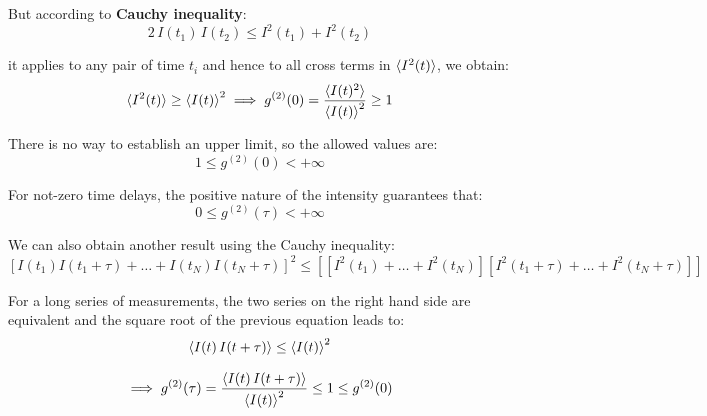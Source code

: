 But according to \textbf{Cauchy inequality}: 
\begin{equation}\label{eqn:cauchy-inequality}
2\, I(t_1)\, I(t_2) \leq I^2(t_1)+I^2(t_2)
\end{equation}

it applies to any pair of time $t_i$ and hence to all cross terms in $\braket{I^2(t)}$, we obtain:
\[\braket{I^2(t)} \geq \braket{I(t)}^2 \implies g^{(2)}(0) = \frac{\braket{I(t)^2}}{\braket{I(t)}^2}\geq 1 \]

There is no way to establish an upper limit, so the allowed values are:
\[1 \leq g^{(2)}(0) < +\infty\]

For not-zero time delays, the positive nature of the intensity guarantees that:
\[0 \leq g^{(2)}(\tau) < +\infty\]

We can also obtain another result using the Cauchy inequality:
\begin{equation}\label{eqn:cauchy-inequality-2}
[I(t_1) I(t_1+\tau) + \dots + I(t_N) I(t_N+\tau)]^2 \leq 
\left[
    [I^2(t_1) + \dots + I^2(t_N)] [I^2(t_1+\tau) + \dots + I^2(t_N+\tau)]
\right]
\end{equation}

For a long series of measurements, the two series on the right hand side are equivalent and the square root of the previous equation leads to:
\[\braket{I(t) \, I(t+\tau)} \leq \braket{I(t)}^2\]

\[\implies g^{(2)}(\tau) = \frac{\braket{I(t)\, I(t+\tau)}}{\braket{I(t)}^2} \leq 1 \leq g^{(2)}(0) \]


